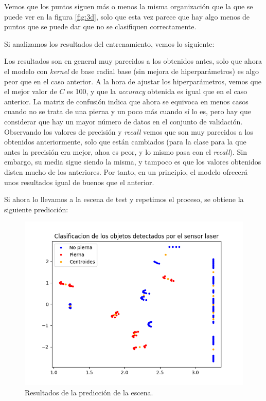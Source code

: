 \documentclass[11pt,a4paper]{article}
\begin{document}
Vemos que los puntos siguen más o menos la misma organización que la que se puede
ver en la figura \ref{fig:3d}, solo que esta vez parece que hay algo menos
de puntos que se puede dar que no se clasifiquen correctamente.

Si analizamos los resultados del entrenamiento, vemos lo siguiente:

\begin{scriptsize}

\end{scriptsize}

Los resultados son en general muy parecidos a los obtenidos antes, solo que ahora
el modelo con \textit{kernel} de base radial base (sin mejora de hiperparámetros)
es algo peor que en el caso anterior. A la hora de ajustar los hiperparámetros, vemos
que el mejor valor de $C$ es 100, y que la \textit{accuracy} obtenida es igual 
que en el caso anterior. La matriz de confusión indica que ahora se equivoca en menos
casos cuando no se trata de una pierna y un poco más cuando sí lo es, pero hay que considerar
que hay un mayor número de datos en el conjunto de validación. Observando los valores de precisión
y \textit{recall} vemos que son muy parecidos
a los obtenidos anteriormente, solo que están cambiados (para la clase para la que antes
la precisión era mejor, ahoa es peor, y lo mismo pasa con el \textit{recall}). Sin embargo,
su media sigue siendo la misma, y tampoco es que los valores obtenidos disten mucho de los
anteriores. Por tanto, en un principio, el modelo ofrecerá unos resultados igual de buenos
que el anterior.

Si ahora lo llevamos a la escena de test y repetimos el proceso, se obtiene la siguiente
predicción:

\begin{figure}[H]
\centering
\includegraphics[scale=0.5]{img/pred1-bien}
\caption{Resultados de la predicción de la escena.}
\label{fig:pred1-bien}
\end{figure}
\end{document}
